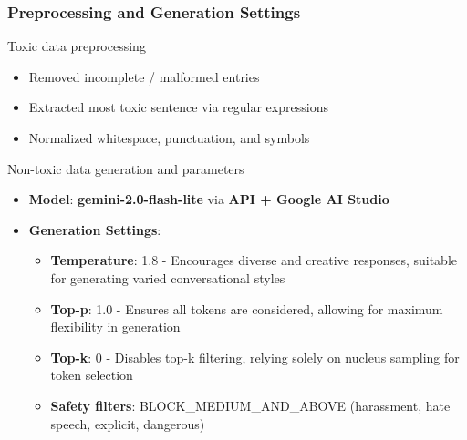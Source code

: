 \documentclass{beamer}
\begin{document}
\begin{frame}
\frametitle{Preprocessing and Generation Settings}

\begin{block}{Toxic data preprocessing}
\begin{itemize}
\item Removed incomplete / malformed entries
\item Extracted most toxic sentence via regular expressions
\item Normalized whitespace, punctuation, and symbols
\end{itemize}
\end{block}

\begin{exampleblock}{Non-toxic data generation and parameters}
\begin{itemize}
\item \textbf{Model}: \textbf{gemini-2.0-flash-lite} via \textbf{API + Google AI Studio}
\item \textbf{Generation Settings}:
\begin{itemize}
\item \textbf{Temperature}: 1.8 - Encourages diverse and creative responses, suitable for generating varied conversational styles
\item \textbf{Top-p}: 1.0 - Ensures all tokens are considered, allowing for maximum flexibility in generation
\item \textbf{Top-k}: 0 - Disables top-k filtering, relying solely on nucleus sampling for token selection
\item \textbf{Safety filters}: BLOCK\_MEDIUM\_AND\_ABOVE (harassment, hate speech, explicit, dangerous)
\end{itemize}
\end{itemize}
\end{exampleblock}

\end{frame}
\end{document}
